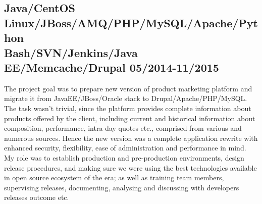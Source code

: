 \documentclass[%
               doublesided,
               paper=a4,
               fontsize=10pt
              ]{my-resume}
\begin{document}
{    \subsection{Java/CentOS Linux/JBoss/AMQ/PHP/MySQL/Apache/Python\\
    Bash/SVN/Jenkins/Java EE/Memcache/Drupal {\small 05/2014-11/2015}}
    The project goal was to prepare new version of product marketing platform
    and migrate it from JavaEE/JBoss/Oracle stack to Drupal/Apache/PHP/MySQL.
    The task wasn't trivial, since the platform provides complete information
    about products offered by the client, including current and historical
    information about composition, performance, intra-day quotes etc., comprised from
    various and numerous sources.  Hence the new version was a complete application rewrite
    with enhanced security, flexibility, ease of administration and performance in mind.
    My role was to establish production and pre-production environments, design release
    procedures, and making sure we were using the best technologies available in open
    source ecosystem of the era; as well as training team members, supervising releases,
    documenting, analysing and discussing with developers releases outcome etc.
    \vspace{0.5em}
    
    

    
    

}
\end{document}
